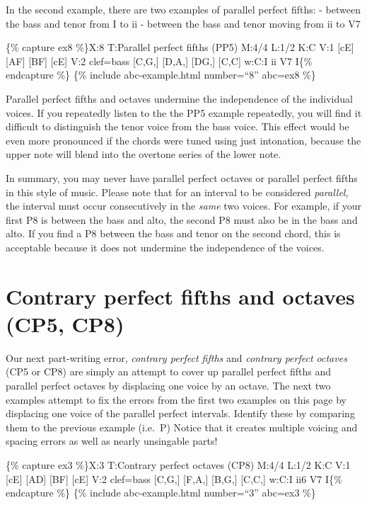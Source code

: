 \documentclass{book}
\begin{document}
In the second example, there are two examples of parallel perfect fifths: -
between the bass and tenor from I to ii - between the bass and tenor moving
from ii to V7

\{\% capture ex8 \%\}X:8 T:Parallel perfect fifths (PP5) M:4/4 L:1/2 K:C V:1
{[}cE{]} {[}AF{]}\textbar{} {[}BF{]} {[}cE{]}\textbar{]} V:2 clef=bass
{[}C,G,{]} {[}D,A,{]} \textbar{} {[}DG,{]} {[}C,C{]}\textbar{]} w:C:I ii V7
I\{\% endcapture \%\} \{\% include abc-example.html number=``8'' abc=ex8 \%\}

Parallel perfect fifths and octaves undermine the independence of the
individual voices. If you repeatedly listen to the the PP5 example repeatedly,
you will find it difficult to distinguish the tenor voice from the bass voice.
This effect would be even more pronounced if the chords were tuned using just
intonation, because the upper note will blend into the overtone series of the
lower note.

In summary, you may never have parallel perfect octaves or parallel perfect
fifths in this style of music. Please note that for an interval to be
considered \emph{parallel}, the interval must occur consecutively in the
\emph{same} two voices. For example, if your first P8 is between the bass and
alto, the second P8 must also be in the bass and alto. If you find a P8
between the bass and tenor on the second chord, this is acceptable because it
does not undermine the independence of the voices.

\hypertarget{contrary-perfect-fifths-and-octaves-cp5-cp8}{%
\section{Contrary perfect fifths and octaves (CP5,
CP8)}\label{contrary-perfect-fifths-and-octaves-cp5-cp8}}

Our next part-writing error, \emph{contrary perfect fifths} and \emph{contrary
perfect octaves} (CP5 or CP8) are simply an attempt to cover up parallel
perfect fifths and parallel perfect octaves by displacing one voice by an
octave. The next two examples attempt to fix the errors from the first two
examples on this page by displacing one voice of the parallel perfect
intervals. Identify these by comparing them to the previous example (i.e.~P)
Notice that it creates multiple voicing and spacing errors as well as nearly
unsingable parts!

\{\% capture ex3 \%\}X:3 T:Contrary perfect octaves (CP8) M:4/4 L:1/2 K:C V:1
{[}cE{]} {[}AD{]}\textbar{} {[}BF{]} {[}cE{]}\textbar{]} V:2 clef=bass
{[}C,G,{]} {[}F,A,{]} \textbar{} {[}B,G,{]} {[}C,C,{]}\textbar{]} w:C:I ii6 V7
I\{\% endcapture \%\} \{\% include abc-example.html number=``3'' abc=ex3 \%\}
\end{document}
